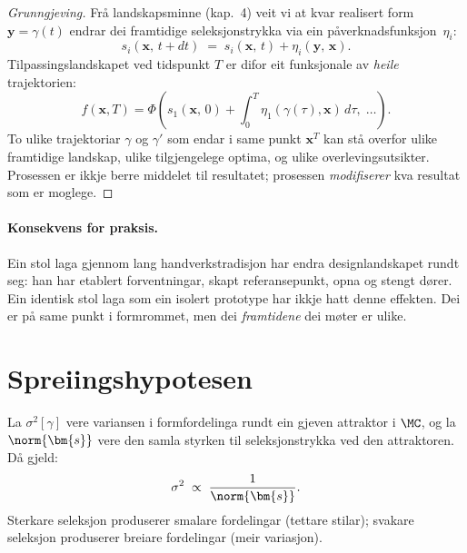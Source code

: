 \begin{proof}[Grunngjeving]
Frå landskapsminne (kap.~4) veit vi at kvar realisert form
$\bm{y} = \gamma(t)$ endrar dei framtidige seleksjonstrykka via
ein påverknadsfunksjon~$\eta_i$:
\[
  s_i(\bm{x},\, t + dt) \;=\;
  s_i(\bm{x},\, t) + \eta_i(\bm{y},\, \bm{x}).
\]
Tilpassingslandskapet ved tidspunkt $T$ er difor eit funksjonale
av \emph{heile} trajektorien:
\[
  f(\bm{x}, T) = \Phi\!\left(
    s_1\!\left(\bm{x},\, 0\right) +
    \int_0^T \!\eta_1(\gamma(\tau), \bm{x})\, d\tau,\;
    \ldots
  \right).
\]
To ulike trajektoriar $\gamma$ og $\gamma'$ som endar i same
punkt $\bm{x}^T$ kan stå overfor ulike framtidige landskap, ulike
tilgjengelege optima, og ulike overlevingsutsikter. Prosessen er
ikkje berre middelet til resultatet; prosessen \emph{modifiserer}
kva resultat som er moglege.
\end{proof}

\paragraph{Konsekvens for praksis.}
Ein stol laga gjennom lang handverkstradisjon har endra
designlandskapet rundt seg: han har etablert forventningar,
skapt referansepunkt, opna og stengt dører. Ein identisk stol
laga som ein isolert prototype har ikkje hatt denne effekten. Dei
er på same punkt i formrommet, men dei \emph{framtidene} dei møter
er ulike.


\section{Spreiingshypotesen}

\begin{satmark}[Spreiingsrelasjonen]\label{thm:L.8.4}
La $\sigma^2[\gamma]$ vere variansen i formfordelinga rundt ein
gjeven attraktor i $\MC$, og la $\norm{\bm{s}}$ vere den samla
styrken til seleksjonstrykka ved den attraktoren. Då gjeld:
\[
  \sigma^2 \;\propto\; \frac{1}{\norm{\bm{s}}}.
\]
Sterkare seleksjon produserer smalare fordelingar (tettare
stilar); svakare seleksjon produserer breiare fordelingar (meir
variasjon).
\end{satmark}

